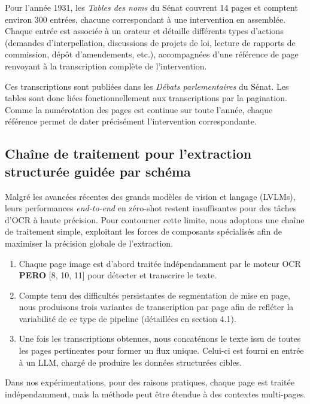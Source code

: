 Pour l’année 1931, les \emph{Tables des noms} du Sénat couvrent 14 pages et comptent environ 300 entrées, chacune correspondant à une intervention en assemblée. Chaque entrée est associée à un orateur et détaille différents types d’actions (demandes d’interpellation, discussions de projets de loi, lecture de rapports de commission, dépôt d’amendements, etc.), accompagnées d’une référence de page renvoyant à la transcription complète de l’intervention.

Ces transcriptions sont publiées dans les \emph{Débats parlementaires} du Sénat. Les tables sont donc liées fonctionnellement aux transcriptions par la pagination. Comme la numérotation des pages est continue sur toute l’année, chaque référence permet de dater précisément l’intervention correspondante.

\subsection{Chaîne de traitement pour l’extraction structurée guidée par schéma}

Malgré les avancées récentes des grands modèles de vision et langage (LVLMs), leurs performances \emph{end-to-end} en zéro-shot restent insuffisantes pour des tâches d’OCR à haute précision. Pour contourner cette limite, nous adoptons une chaîne de traitement simple, exploitant les forces de composants spécialisés afin de maximiser la précision globale de l’extraction.

\begin{enumerate}
\item Chaque page image est d’abord traitée indépendamment par le moteur OCR \textbf{PERO} [8, 10, 11] pour détecter et transcrire le texte.
\item Compte tenu des difficultés persistantes de segmentation de mise en page, nous produisons trois variantes de transcription par page afin de refléter la variabilité de ce type de pipeline (détaillées en section 4.1).
\item Une fois les transcriptions obtenues, nous concaténons le texte issu de toutes les pages pertinentes pour former un flux unique. Celui-ci est fourni en entrée à un LLM, chargé de produire les données structurées cibles.

\end{enumerate}
Dans nos expérimentations, pour des raisons pratiques, chaque page est traitée indépendamment, mais la méthode peut être étendue à des contextes multi-pages.

